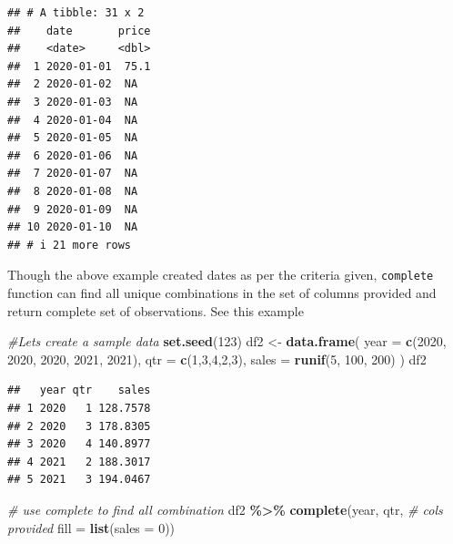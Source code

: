 \documentclass[
]{book}
\newenvironment{Shaded}{\begin{snugshade}}{\end{snugshade}}
\newcommand{\AttributeTok}[1]{\textcolor[rgb]{0.13,0.29,0.53}{#1}}
\newcommand{\CommentTok}[1]{\textcolor[rgb]{0.56,0.35,0.01}{\textit{#1}}}
\newcommand{\DecValTok}[1]{\textcolor[rgb]{0.00,0.00,0.81}{#1}}
\newcommand{\FunctionTok}[1]{\textcolor[rgb]{0.13,0.29,0.53}{\textbf{#1}}}
\newcommand{\NormalTok}[1]{#1}
\newcommand{\OtherTok}[1]{\textcolor[rgb]{0.56,0.35,0.01}{#1}}
\newcommand{\SpecialCharTok}[1]{\textcolor[rgb]{0.81,0.36,0.00}{\textbf{#1}}}
\begin{document}
\begin{verbatim}
## # A tibble: 31 x 2
##    date       price
##    <date>     <dbl>
##  1 2020-01-01  75.1
##  2 2020-01-02  NA  
##  3 2020-01-03  NA  
##  4 2020-01-04  NA  
##  5 2020-01-05  NA  
##  6 2020-01-06  NA  
##  7 2020-01-07  NA  
##  8 2020-01-08  NA  
##  9 2020-01-09  NA  
## 10 2020-01-10  NA  
## # i 21 more rows
\end{verbatim}

Though the above example created dates as per the criteria given, \texttt{complete} function can find all unique combinations in the set of columns provided and return complete set of observations. See this example

\begin{Shaded}
\begin{Highlighting}[]
\CommentTok{\#Let\textquotesingle{}s create a sample data}
\FunctionTok{set.seed}\NormalTok{(}\DecValTok{123}\NormalTok{)}
\NormalTok{df2 }\OtherTok{\textless{}{-}} \FunctionTok{data.frame}\NormalTok{(}
  \AttributeTok{year =} \FunctionTok{c}\NormalTok{(}\DecValTok{2020}\NormalTok{, }\DecValTok{2020}\NormalTok{, }\DecValTok{2020}\NormalTok{, }\DecValTok{2021}\NormalTok{, }\DecValTok{2021}\NormalTok{),}
  \AttributeTok{qtr =} \FunctionTok{c}\NormalTok{(}\DecValTok{1}\NormalTok{,}\DecValTok{3}\NormalTok{,}\DecValTok{4}\NormalTok{,}\DecValTok{2}\NormalTok{,}\DecValTok{3}\NormalTok{),}
  \AttributeTok{sales =} \FunctionTok{runif}\NormalTok{(}\DecValTok{5}\NormalTok{, }\DecValTok{100}\NormalTok{, }\DecValTok{200}\NormalTok{)}
\NormalTok{)}
\NormalTok{df2}
\end{Highlighting}
\end{Shaded}

\begin{verbatim}
##   year qtr    sales
## 1 2020   1 128.7578
## 2 2020   3 178.8305
## 3 2020   4 140.8977
## 4 2021   2 188.3017
## 5 2021   3 194.0467
\end{verbatim}

\begin{Shaded}
\begin{Highlighting}[]
\CommentTok{\# use complete to find all combination}
\NormalTok{df2 }\SpecialCharTok{\%\textgreater{}\%} 
  \FunctionTok{complete}\NormalTok{(year, qtr, }\CommentTok{\# cols provided}
           \AttributeTok{fill =} \FunctionTok{list}\NormalTok{(}\AttributeTok{sales =} \DecValTok{0}\NormalTok{))}
\end{Highlighting}
\end{Shaded}
\end{document}
